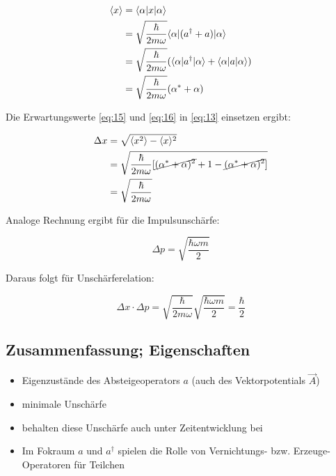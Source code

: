\begin{align}
  \label{eq:16}
   \langle x\rangle &= \langle \alpha|x|\alpha\rangle  \notag\\
 &= \sqrt{ \frac{\hbar}{2m\omega}}\langle \alpha|(a^\dagger + a)|\alpha\rangle \notag\\
 &= \sqrt{\frac{\hbar}{2m\omega}}(\langle \alpha|a^\dagger|\alpha\rangle +\langle \alpha| a|\alpha\rangle)\notag \\
 &= \sqrt{\frac{\hbar}{2m\omega}}(\alpha^* + \alpha)
\end{align}

Die Erwartungswerte \eqref{eq:15} und \eqref{eq:16} in \eqref{eq:13} einsetzen ergibt:

\begin{align}
  \label{eq:17}
  \Delta x &= \sqrt{ \langle x^2\rangle -\langle x\rangle^2 }  \notag\\
 &=\sqrt{\frac{\hbar}{2m\omega}[\cancel{( \alpha^*+\alpha)^2} + 1 - \cancel{ (\alpha^* + \alpha)^2}  ]} \notag\\
 &=\sqrt{\frac{\hbar}{2m\omega}}
\end{align}

Analoge Rechnung ergibt für die Impulsunschärfe:

\begin{equation}
  \label{eq:18}
  \Delta p = \sqrt{\frac{\hbar \omega m}{2}}
\end{equation}

Daraus folgt für Unschärferelation:

\begin{equation}
  \label{eq:19}
  \Delta x\cdot\Delta p = \sqrt{\frac{\hbar}{2m\omega}} \sqrt{\frac{\hbar \omega m}{2}} = \frac{\hbar}{2}
\end{equation}


\subsection*{Zusammenfassung; Eigenschaften}

\begin{itemize}
\item Eigenzustände des Absteigeoperators \(a\) (auch des Vektorpotentials \(\vec A\))
\item minimale Unschärfe
\item behalten diese Unschärfe auch unter Zeitentwicklung bei
\item Im Fokraum \(a\) und \(a^\dagger\) spielen die Rolle von Vernichtungs- bzw. Erzeuge-Operatoren für Teilchen
\end{itemize}


